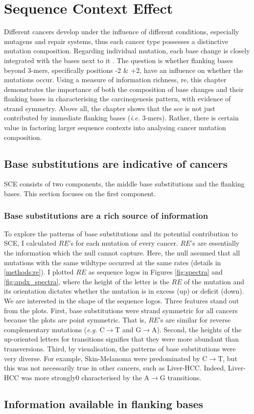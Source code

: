 \chapter{Sequence Context Effect}\label{sce}

Different cancers develop under the influence of different conditions, especially mutagens and repair systems, thus each cancer type possesses a distinctive mutation composition. Regarding individual mutation, each base change is closely integrated with the bases next to it \citep{Zhu2017,Zhu2020,Vinson2012CGMethylation}. The question is whether flanking bases beyond 3-mers, specifically positions -2 \& +2, have an influence on whether the mutations occur. Using a measure of information richness, \gls{re}, this chapter demonstrates the importance of both the composition of base changes and their flanking bases in characterising the carcinogenesis pattern, with evidence of strand symmetry. Above all, the chapter shows that the \gls{sce} is not just contributed by immediate flanking bases (\textit{i.e.} 3-mers). Rather, there is certain value in factoring larger sequence contexts into analysing cancer mutation composition.

\section{Base substitutions are indicative of cancers}
SCE consists of two components, the middle base substitutions and the flanking bases. This section focuses on the first component.

\subsection{Base substitutions are a rich source of information}
To explore the patterns of base substitutions and its potential contribution to SCE, I calculated $RE$'s for each mutation of every cancer. $RE$'s are essentially the information which the null cannot capture. Here, the null assumed that all mutations with the same wildtype occurred at the same rates (details in \ref{methods:re}). I plotted $RE$ as sequence logos in Figures \ref{fig:spectra} and \ref{fig:apdx_spectra}, where the height of the letter is the $RE$ of the mutation and its orientation dictates whether the mutation is in excess (up) or deficit (down). We are interested in the shape of the sequence logos. Three features stand out from the plots. First, base substitutions were strand symmetric for all cancers because the plots are point symmetric. That is, $RE$'s are similar for reverse complementary mutations (\textit{e.g.} C$\rightarrow$T and G$\rightarrow$A). Second, the heights of the up-oriented letters for transitions signifies that they were more abundant than transversions. Third, by visualisation, the patterns of base substitutions were very diverse. For example, Skin-Melanoma were predominated by C$\rightarrow$T, but this was not necessarily true in other cancers, such as Liver-HCC. Indeed, Liver-HCC was more strongly0 characterised by the A$\rightarrow$G transitions.



\section{Information available in flanking bases}